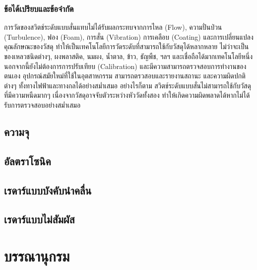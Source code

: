 \documentclass[final,11pt]{article}
\begin{document}
\subsubsection{ข้อได้เปรียบและข้อจำกัด}
การวัดของสวิตช์ระดับแบบสั่นแทบไม่ได้รับผลกระทบจากการไหล (Flow), ความปั่นป่วน (Turbulence), ฟอง (Foam), การสั่น (Vibration)
การเคลือบ (Coating) และการเปลี่ยนแปลงคุณลักษณะของวัสดุ ทำให้เป็นเทคโนโลยีการวัดระดับที่สามารถใช้กับวัสดุได้หลากหลาย ไม่ว่าจะเป็นของเหลวชนิดต่างๆ,
ผงพลาสติค, นมผง, น้ำตาล, ข้าว, ธัญพืช, ฯลฯ และเชื่อถือได้มากเทคโนโลยีหนี่ง 
นอกจากนี้ยังไม่ต้องการการปรับเทียบ (Calibration) และมีความสามารถตรวจสอบการทำงานของตนเอง อุปกรณ์สมัยใหม่ที่ใช้ในอุตสาหกรรม 
สามารถตรวสอบและรายงานสถานะ และความผิดปกติต่างๆ ทั้งทางไฟฟ้าและทางกลได้อย่างสม่ำเสมอ อย่างไรก็ตาม 
สวิตช์ระดับแบบสั่นไม่สามารถใช้กับวัสดุที่มีความหนืดมากๆ เนื่องจากวัสดุอาจจับตัวระหว่างหัววัดทั้งสอง ทำให้เกิดความผิดพลาดได้หากไม่ได้รับการตรวจสอบอย่างสม่ำเสมอ 
\subsection{ความจุ}
\subsection{อัลตราโซนิค}
\subsection{เรดาร์แบบบังคับนำคลื่น}
\subsection{เรดาร์แบบไม่สัมผัส}
\section{บรรณานุกรม}
\end{document}
